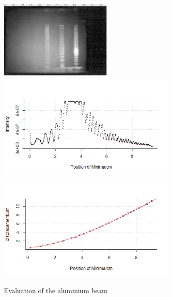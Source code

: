 \begin{figure}
	\centering
	\includegraphics[width=0.5\textwidth]{../figures/Stab1gwid.png}
	\includegraphics[width=0.8\textwidth]{../figures/Stab1R1.png}
	\includegraphics[width=0.8\textwidth]{../figures/Stab1R2.png}
	\caption{Evaluation of the aluminium beam}
\end{figure}